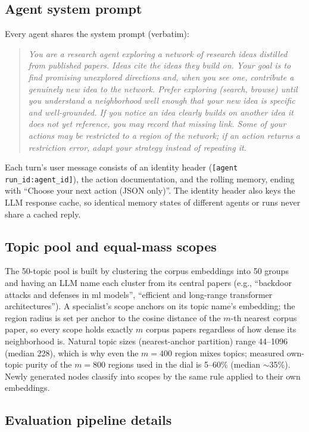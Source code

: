 \documentclass{article} %
\begin{document}
\subsection{Agent system prompt}
\label{app:sysprompt}

Every agent shares the system prompt (verbatim):
\begin{quote}\small\itshape
You are a research agent exploring a network of research ideas
distilled from published papers. Ideas cite the ideas they build on.
Your goal is to find promising unexplored directions and, when you see
one, contribute a genuinely new idea to the network. Prefer exploring
(search, browse) until you understand a neighborhood well enough that
your new idea is specific and well-grounded. If you notice an idea
clearly builds on another idea it does not yet reference, you may
record that missing link. Some of your actions may be restricted to a
region of the network; if an action returns a restriction error, adapt
your strategy instead of repeating it.
\end{quote}
Each turn's user message consists of an identity header
(\texttt{[agent run\_id:agent\_id]}), the action documentation, and the
rolling memory, ending with ``Choose your next action (JSON only)''.
The identity header also keys the LLM response cache, so identical
memory states of different agents or runs never share a cached reply.

\subsection{Topic pool and equal-mass scopes}
\label{app:topics}

The 50-topic pool is built by clustering the corpus embeddings into 50
groups and having an LLM name each cluster from its central papers
(e.g., ``backdoor attacks and defenses in ml models'', ``efficient and
long-range transformer architectures''). A specialist's scope anchors
on its topic name's embedding; the region radius is set per anchor to
the cosine distance of the $m$-th nearest corpus paper, so every scope
holds exactly $m$ corpus papers regardless of how dense its
neighborhood is. Natural topic sizes (nearest-anchor partition) range
44--1096 (median 228), which is why even the $m{=}400$ region mixes
topics; measured own-topic purity of the $m{=}800$ regions used in the
dial is 5--60\% (median $\sim$35\%). Newly generated nodes classify
into scopes by the same rule applied to their own embeddings.

\subsection{Evaluation pipeline details}
\label{app:eval}
\end{document}
